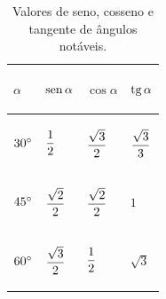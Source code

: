 \begin{center}
 \end{center}
 \vspace{-0.2cm}
\begin{table}[!h]
    \centering     
    \caption{Valores de seno, cosseno e tangente de ângulos notáveis.}
    \begin{tabular}{p{}p{}p{}p{}}
\hline
 \begin{center}
     $\alpha$
 \end{center} 
 & 
 \begin{center}
     $\operatorname{sen} \alpha$ 
 \end{center}
 & 
 \begin{center}
     $\cos \alpha$ 
 \end{center}
 & 
 \begin{center}
     $\operatorname{tg} \alpha$
 \end{center}
 \\[-0.4cm]
\hline
 \begin{center}
     $30 \degree$ 
 \end{center}
 & 
 \begin{center}
     $\displaystyle\frac{1}{2}$ 
 \end{center}
 & 
 \begin{center}
     $\displaystyle\frac{\sqrt{3}}{2}$ 
 \end{center}
 & 
 \begin{center}
     $\displaystyle\frac{\sqrt{3}}{3}$
 \end{center}\\[0.35cm]
 \begin{center}
     $45 \degree$ 
 \end{center}
 & 
 \begin{center}
     $\displaystyle\frac{\sqrt{2}}{2}$ 
 \end{center}
 & 
 \begin{center}
     $\displaystyle\frac{\sqrt{2}}{2}$ 
 \end{center}
 & 
 \begin{center}
     $1$ 
 \end{center}\\[0.35cm]
 \begin{center}
     $60 \degree$
 \end{center} 
 & \begin{center}
     $\displaystyle\frac{\sqrt{3}}{2}$
 \end{center} 
 & 
 \begin{center}
     $\displaystyle\frac{1}{2}$ 
 \end{center}
 & 
 \begin{center}
     $\sqrt{3}$
 \end{center}\\%
\hline
\end{tabular}
\label{tab:01}
\end{table}

